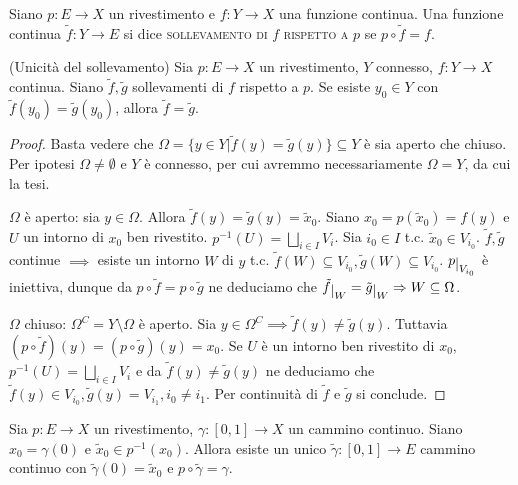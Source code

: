 \begin{defn}
  Siano $p: E \longrightarrow X$ un rivestimento e $f: Y \longrightarrow X$ una funzione continua. Una funzione continua $\tilde{f}: Y \longrightarrow E$ si dice \textsc{sollevamento di $f$ rispetto a $p$} se $p \circ \tilde{f}=f$.
\end{defn}

\begin{prop} \label{unic_soll}
  (Unicità del sollevamento)
  Sia $p: E \longrightarrow X$ un rivestimento, $Y$ connesso, $f: Y \longrightarrow X$ continua. Siano $\tilde{f}, \tilde{g}$ sollevamenti di $f$ rispetto a $p$. Se esiste $y_0 \in Y$ con $\tilde{f}(y_0)=\tilde{g}(y_0)$, allora $\tilde{f}=\tilde{g}$.
\end{prop}

\begin{proof}
  Basta vedere che $\Omega=\{ y \in Y | \tilde{f}(y)=\tilde{g}(y)\} \subseteq Y$ è sia aperto che chiuso. Per ipotesi $\Omega \not= \emptyset$ e $Y$ è connesso, per cui avremmo necessariamente $\Omega=Y$, da cui la tesi.

  $\Omega$ è aperto: sia $y \in \Omega$. Allora $\tilde{f}(y)=\tilde{g}(y)=\tilde{x}_0$. Siano $x_0=p(\tilde{x}_0)=f(y)$ e $U$ un intorno di $x_0$ ben rivestito.
  $\displaystyle p^{-1}(U)=\bigsqcup_{i \in I} V_i$. Sia $i_0 \in I$ t.c. $\tilde{x}_0 \in V_{i_0}$.
  $\tilde{f}, \tilde{g}$ continue $\implies$ esiste un intorno $W$ di $y$ t.c. $\tilde{f}(W) \subseteq V_{i_0}, \tilde{g}(W) \subseteq V_{i_0}$.
  $p \restrict{V_{i_0}}$ è iniettiva, dunque da $p \circ \tilde{f}=p \circ \tilde{g}$ ne deduciamo che $\tilde{f} \restrict{W}=\tilde{g} \restrict{W} \implies W \subseteq \Omega$.

  $\Omega$ chiuso: $\Omega^C=Y \setminus \Omega$ è aperto. Sia $y \in \Omega^C \implies \tilde{f}(y) \not= \tilde{g}(y)$. Tuttavia $(p \circ \tilde{f})(y)=(p \circ \tilde{g})(y)=x_0$.
  Se $U$ è un intorno ben rivestito di $x_0$, $\displaystyle p^{-1}(U)=\bigsqcup_{i \in I} V_i$ e da $\tilde{f}(y) \not= \tilde{g}(y)$ ne deduciamo che $\tilde{f}(y) \in V_{i_0}, \tilde{g}(y)=V_{i_1}, i_0 \not= i_1$. Per continuità di $\tilde{f}$ e $\tilde{g}$ si conclude.
\end{proof}

\begin{thm}
  Sia $p:E \longrightarrow X$ un rivestimento, $\gamma:[0, 1] \longrightarrow X$ un cammino continuo. Siano $x_0=\gamma(0)$ e $\tilde{x}_0 \in p^{-1}(x_0)$.
  Allora esiste un unico $\tilde{\gamma}:[0, 1] \longrightarrow E$ cammino continuo con $\tilde{\gamma}(0)=\tilde{x}_0$ e $p \circ \tilde{\gamma}=\gamma$.
\end{thm}

